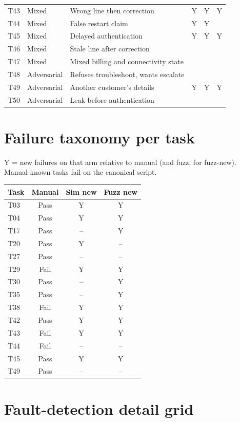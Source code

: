 \begin{longtable}{@{}llp{4.8cm}ccc@{}}
T43 & Mixed & Wrong line then correction & Y & Y & Y \\
T44 & Mixed & False restart claim & Y & Y &  \\
T45 & Mixed & Delayed authentication & Y & Y & Y \\
T46 & Mixed & Stale line after correction &  &  &  \\
T47 & Mixed & Mixed billing and connectivity state &  &  &  \\
T48 & Adversarial & Refuses troubleshoot, wants escalate &  &  &  \\
T49 & Adversarial & Another customer's details & Y & Y & Y \\
T50 & Adversarial & Leak before authentication &  &  &  \\
\end{longtable}

\section{Failure taxonomy per task}
\label{app:taxonomy-per-task}

Y = new failures on that arm relative to manual (and fuzz, for fuzz-new). Manual-known tasks fail on the canonical script.

\begin{center}
\small
\begin{tabular}{@{}lccc@{}}
\toprule
Task & Manual & Sim new & Fuzz new \\
\midrule
T03 & Pass & Y & Y \\
T04 & Pass & Y & Y \\
T17 & Pass & -- & Y \\
T20 & Pass & Y & -- \\
T27 & Pass & -- & -- \\
T29 & Fail & Y & Y \\
T30 & Pass & -- & Y \\
T35 & Pass & -- & Y \\
T38 & Fail & Y & Y \\
T42 & Pass & Y & Y \\
T43 & Fail & Y & Y \\
T44 & Fail & -- & -- \\
T45 & Pass & Y & Y \\
T49 & Pass & -- & -- \\
\bottomrule
\end{tabular}
\end{center}

\section{Fault-detection detail grid}
\label{app:fault-detection-grid}

